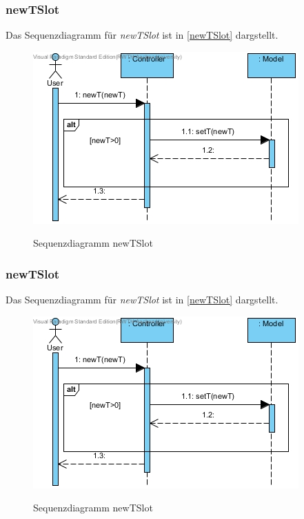\subsubsection*{newTSlot}

Das Sequenzdiagramm für \emph{newTSlot} ist in \ref{newTSlot} dargstellt.

\begin{figure}[H]
	\centering
	\includegraphics[scale=.6]{Bilder/Controller__newTSlot().jpg}\\
	\caption{Sequenzdiagramm newTSlot}
	\label{Sequenzdiagramm newTSlot}
\end{figure}

\subsubsection*{newTSlot}

Das Sequenzdiagramm für \emph{newTSlot} ist in \ref{newTSlot} dargstellt.

\begin{figure}[H]
	\centering
	\includegraphics[scale=.6]{Bilder/Controller__newTSlot().jpg}\\
	\caption{Sequenzdiagramm newTSlot}
	\label{Sequenzdiagramm newTSlot}
\end{figure}

